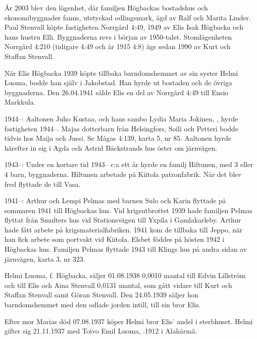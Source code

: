 År 2003 blev den lägenhet, där familjen Högbackas bostadshus och ekonomibyggnader fanns, utstyckad odlingsmark, ägd av Ralf och Marita Linder. Paul Stenvall köpte fastigheten Norrgård 4:49, 1949 av Elis Isak Högbacka och hans hustru Elli. Byggnaderna revs i början av 1950-talet. Stomlägenheten Norrgård 4:210 (tidigare 4:49 och år 1915 4:8) ägs sedan 1990 av Kurt och Staffan Stenvall.


När Elis Högbacka 1939 köpte tillbaka barndomshemmet av sin syster Helmi Luoma, bodde han själv i Jakobstad. Han hyrde ut bostaden och de övriga byggnaderna. Den 26.04.1941 sålde Elis en del av Norrgård 4:49 till Ensio Markkula.


1944--:
Aaltonen Juho Kustaa,  och hans sambo Lydia Maria Jokinen, , hyrde fastigheten 1944--. Majas dotterbarn från Helsingfors, Soili och Petteri bodde tidvis hos Maija och Jussi. Se Mågas 4:139, karta 5, nr 85. Aaltonen hyrde härefter in sig i Agda och Astrid Bäckstrands hus öster om järnvägen.

1943--:
Under en kortare tid 1943-- c:a ett år hyrde en familj Hiltunen, med 3 eller 4 barn, byggnaderna. Hiltunen arbetade på Kiitola patronfabrik. När det blev fred flyttade de till Vasa.

1941--:
Arthur och Lempi Pelmas med barnen Sulo och Karin	flyttade på sommaren 1941 till Högbackas hus. Vid krigsutbrottet 1939 hade familjen Pelmas flyttat från Smulters hus vid Stationsvägen till Yxpila i Gamlakarleby. Arthur hade fått arbete på krigsmaterialfabriken. 1941 kom de tillbaka till Jeppo, när han fick arbete som portvakt vid Kiitola. Elsbet föddes på hösten 1942 i Högbackas hus. Familjen Pelmas flyttade 1943 till Klings hus på andra sidan av järnvägen, karta 3, nr 323.


Helmi Luoma, f. Högbacka, säljer 01.08.1938 0,0010 mantal till Edvin Lillström och till Elis och Aina Stenvall 0,0131 mantal, som gått vidare till Kurt och Staffan Stenvall samt Göran Stenvall. Den 24.05.1939 säljer hon barndomshemmet med den odlade jorden intill, till sin bror Elis.


Efter mor Marias död 07.08.1937 köper Helmi bror Elis' andel i sterbhuset. Helmi gifter sig 21.11.1937 med Toivo Emil Luoma, .1912 i Alahärmä.\jhvspace{}


